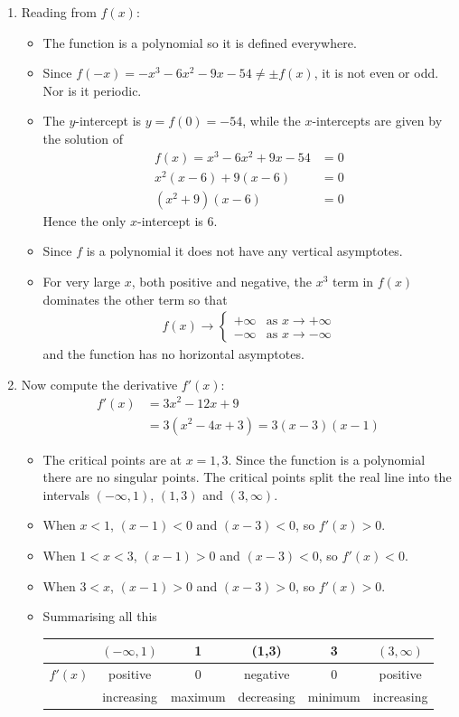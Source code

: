 \begin{eg}[$f(x) = x^3 - 6x^2 + 9x - 54$]\label{eg_3_6_5}
\begin{enumerate}[(1)]
\item Reading from $f(x)$:
\begin{itemize}
 \item The function is a polynomial so it is defined everywhere.
\item Since $f(-x) = -x^3-6x^2-9x-54 \neq \pm f(x)$, it is not even or
odd. Nor is it periodic.
\item The $y$-intercept is $y=f(0)=-54$, while the $x$-intercepts are given by
the solution of
\begin{align*}
  f(x)=x^3-6x^2+9x-54 &= 0\\
  x^2(x-6) + 9(x-6) &=0 \\
  (x^2+9)(x-6) &= 0
\end{align*}
Hence the only $x$-intercept is $6$.

\item Since $f$ is a polynomial it does not have any vertical asymptotes.
\item For very large $x$, both positive and negative, the $x^3$ term in $f(x)$
dominates the other term so that
\begin{align*}
f(x)\rightarrow\begin{cases}+\infty &\text{as }x\rightarrow+\infty \\
                            -\infty &\text{as }x\rightarrow-\infty
                \end{cases}
\end{align*}
and the function has no horizontal asymptotes.
\end{itemize}

\item Now compute the derivative $f'(x)$:
\begin{align*}
f'(x) &= 3x^2-12x+9 \\
  &= 3(x^2-4x+3) = 3(x-3)(x-1)
\end{align*}
\begin{itemize}
 \item The critical points are at $x=1,3$. Since the function is a polynomial
there are no singular points. The critical points split the real line into the
intervals
$(-\infty,1)$, $(1,3)$ and $(3,\infty)$.
\item When $x<1$, $(x-1)<0$ and $(x-3)<0$, so $f'(x) > 0$.
\item When $1<x<3$, $(x-1)>0$ and $(x-3)<0$, so $f'(x) < 0$.
\item When $3<x$, $(x-1)>0$ and $(x-3)>0$, so $f'(x) > 0$.
\item Summarising all this
\begin{center}
 \begin{tabular}{|c|c||c||c||c||c|}
\hline
  & $(-\infty,1)$ & 1 & (1,3) & 3 & $(3,\infty)$\\
\hline
$f'(x)$  & positive & 0 & negative & 0 & positive \\
\hline
 & increasing & maximum & decreasing & minimum & increasing \\
\hline
 \end{tabular}
\end{center}


\end{itemize}
\end{enumerate}
\end{eg}

